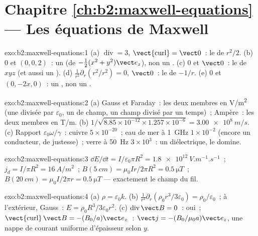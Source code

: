 \section*{Chapitre \ref{ch:b2:maxwell-equations} --- Les équations de Maxwell}

\begin{solution}{exo:b2:maxwell-equations:1}
(a) $\operatorname{div} = 3$, $\operatorname{\vect{curl}} = \vect 0$~: le  de $r^2/2$.
(b) $0$ et $(0, 0, 2)$~: un  (de $-\tfrac12(x^2 + y^2)\vect e_z$), non un
. (c) $0$ et $\vect 0$~: le  de $xyz$ (et aussi un ). (d)
$\frac1{r^2}\partial_r(r^2/r^2) = 0$,  $\vect 0$~: le  de $-1/r$. (e)
$0$ et $(0, -2x, 0)$~: un , non un .
\end{solution}

\begin{solution}{exo:b2:maxwell-equations:2}
(a) Gauss et Faraday~: les deux membres en \unit{V/m^2} (une  divisée par
$\varepsilon_0$, un  de champ, un champ divisé par un temps)~; Ampère~: les deux membres en
\unit{T/m}.
(b) $1/\sqrt{8.85 \times 10^{-12} \times 1.257 \times 10^{-6}} = \qty{3.00e8}{m/s}$. (c) Rapport
$\varepsilon_0\omega/\gamma$~: cuivre $5 \times 10^{-20}$~; eau de mer à \qty{1}{GHz} $1 \times 10^{-2}$
(encore un conducteur, de justesse)~; verre à \qty{50}{Hz} $3 \times 10^3$~: un diélectrique,
le  domine.
\end{solution}

\begin{solution}{exo:b2:maxwell-equations:3}
$\dd E/\dd t = I/\varepsilon_0\pi R^2 = \qty{1.8e12}{V.m^{-1}.s^{-1}}$~; $j_d = I/\pi R^2 =
\qty{16}{A/m^2}$~; $B(\qty{5}{cm}) = \mu_0Ir/2\pi R^2 = \qty{0.5}{\micro T}$~; $B(\qty{20}{cm}) =
\mu_0I/2\pi r = \qty{0.5}{\micro T}$ --- exactement le champ du fil.
\end{solution}

\begin{solution}{exo:b2:maxwell-equations:4}
(a) $\rho = \varepsilon_0k$. (b) $\frac1{r^2}\partial_r(\rho_0r^3/3\varepsilon_0) = \rho_0/\varepsilon_0$~;
à l'extérieur, Gauss~: $E = \rho_0R^3/3\varepsilon_0r^2$. (c) $\operatorname{div}\vect B = 0$~: oui~;
$\operatorname{\vect{curl}}\vect B = -(B_0/a)\vect e_z$~: $\vect j = -(B_0/\mu_0a)\vect e_z$, une
nappe de courant uniforme d'épaisseur selon $y$.
\end{solution}

